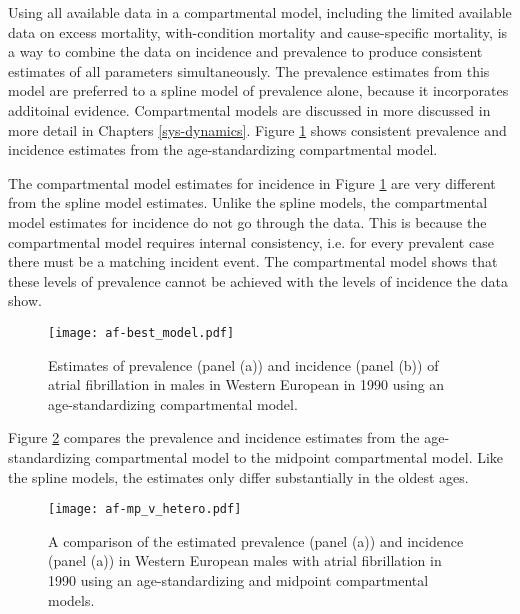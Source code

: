 Using all available data in a compartmental model, including the
limited available data on excess mortality, with-condition mortality
and cause-specific mortality, is a way to combine the data on
incidence and prevalence to produce consistent estimates of all
parameters simultaneously.  The prevalence estimates from this model
are preferred to a spline model of prevalence alone, because it
incorporates additoinal evidence.  Compartmental models are discussed in
more discussed in more detail in Chapters \ref{sys-dynamics}.  Figure
\ref{fig:app-af age-stand} shows consistent prevalence and incidence estimates
from the age-standardizing compartmental model.

The compartmental model estimates for incidence in Figure \ref{fig:app-af age-stand} 
are very different from the spline model estimates.  
Unlike the spline models, the compartmental model estimates for 
incidence do not go through the data.  This is because the compartmental model 
requires internal consistency, i.e. for every prevalent case there must be 
a matching incident event.  The compartmental model shows that these levels 
of prevalence cannot be achieved with the levels of incidence the data show.

    \begin{figure}[h]
        \begin{center}
            \texttt{[image: af-best\_model.pdf]}
            \caption{Estimates of prevalence (panel (a)) and incidence (panel (b))
              of atrial fibrillation in males in Western European in 1990 using
              an age-standardizing compartmental model.}
            \label{fig:app-af age-stand}
        \end{center}
    \end{figure}

Figure \ref{fig:app-af compare} compares the prevalence and incidence
estimates from the age-standardizing compartmental model to the
midpoint compartmental model.  Like the spline models, the
estimates only differ substantially in the oldest ages.

    \begin{figure}[h]
        \begin{center}
            \texttt{[image: af-mp\_v\_hetero.pdf]}
            \caption{A comparison of the estimated prevalence (panel (a)) and incidence (panel
              (a)) in Western European males with atrial fibrillation in 1990 using
              an age-standardizing and midpoint compartmental models.}
            \label{fig:app-af compare}
        \end{center}
    \end{figure}
